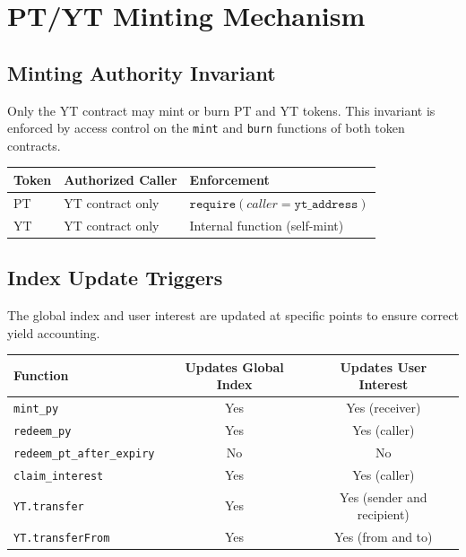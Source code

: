 \section{PT/YT Minting Mechanism}

\subsection{Minting Authority Invariant}

Only the YT contract may mint or burn PT and YT tokens. This invariant is enforced by access control on the \texttt{mint} and \texttt{burn} functions of both token contracts.

\begin{center}
\begin{tabular}{lll}
\toprule
\textbf{Token} & \textbf{Authorized Caller} & \textbf{Enforcement} \\
\midrule
PT & YT contract only & $\texttt{require}(caller = \texttt{yt\_address})$ \\
YT & YT contract only & Internal function (self-mint) \\
\bottomrule
\end{tabular}
\end{center}

\subsection{Index Update Triggers}

The global index and user interest are updated at specific points to ensure correct yield accounting.

\begin{center}
\begin{tabular}{lcc}
\toprule
\textbf{Function} & \textbf{Updates Global Index} & \textbf{Updates User Interest} \\
\midrule
\texttt{mint\_py} & Yes & Yes (receiver) \\
\texttt{redeem\_py} & Yes & Yes (caller) \\
\texttt{redeem\_pt\_after\_expiry} & No & No \\
\texttt{claim\_interest} & Yes & Yes (caller) \\
\texttt{YT.transfer} & Yes & Yes (sender and recipient) \\
\texttt{YT.transferFrom} & Yes & Yes (from and to) \\
\bottomrule
\end{tabular}
\end{center}

